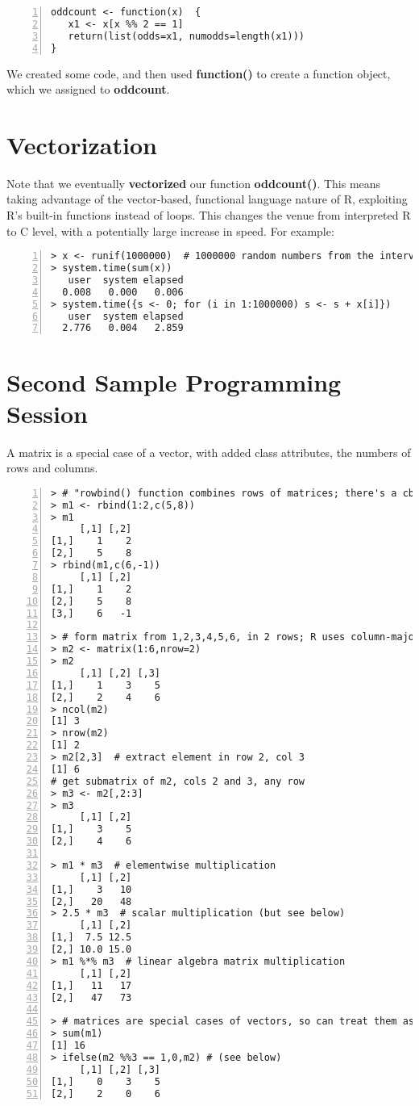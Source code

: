 \begin{lstlisting}[numbers=left]
oddcount <- function(x)  {
   x1 <- x[x %% 2 == 1]
   return(list(odds=x1, numodds=length(x1)))
}
\end{lstlisting}
  
We created some code, and then used {\bf function()} to create a function
object, which we assigned to {\bf oddcount}.

\section{Vectorization}

Note that we eventually {\bf vectorized} our function {\bf oddcount()}.
This means taking advantage of the vector-based, functional language
nature of R, exploiting R's built-in functions instead of loops.  This
changes the venue from interpreted R to C level, with a potentially
large increase in speed.  For example:

\begin{lstlisting}[numbers=left]
> x <- runif(1000000)  # 1000000 random numbers from the interval (0,1)
> system.time(sum(x))
   user  system elapsed 
  0.008   0.000   0.006 
> system.time({s <- 0; for (i in 1:1000000) s <- s + x[i]})
   user  system elapsed 
  2.776   0.004   2.859 
\end{lstlisting}

\section{Second Sample Programming Session}

A matrix is a special case of a vector, with added class attributes,
the numbers of rows and columns.

\begin{lstlisting}[numbers=left]
> # "rowbind() function combines rows of matrices; there's a cbind() too
> m1 <- rbind(1:2,c(5,8))
> m1
     [,1] [,2]
[1,]    1    2
[2,]    5    8
> rbind(m1,c(6,-1))
     [,1] [,2]
[1,]    1    2
[2,]    5    8
[3,]    6   -1

> # form matrix from 1,2,3,4,5,6, in 2 rows; R uses column-major storage
> m2 <- matrix(1:6,nrow=2)  
> m2
     [,1] [,2] [,3]
[1,]    1    3    5
[2,]    2    4    6
> ncol(m2)
[1] 3
> nrow(m2)
[1] 2
> m2[2,3]  # extract element in row 2, col 3
[1] 6
# get submatrix of m2, cols 2 and 3, any row
> m3 <- m2[,2:3]
> m3
     [,1] [,2]
[1,]    3    5
[2,]    4    6

> m1 * m3  # elementwise multiplication
     [,1] [,2]
[1,]    3   10
[2,]   20   48
> 2.5 * m3  # scalar multiplication (but see below)
     [,1] [,2]
[1,]  7.5 12.5
[2,] 10.0 15.0
> m1 %*% m3  # linear algebra matrix multiplication
     [,1] [,2]
[1,]   11   17
[2,]   47   73

> # matrices are special cases of vectors, so can treat them as vectors 
> sum(m1)
[1] 16
> ifelse(m2 %%3 == 1,0,m2) # (see below)
     [,1] [,2] [,3]
[1,]    0    3    5
[2,]    2    0    6
\end{lstlisting}

